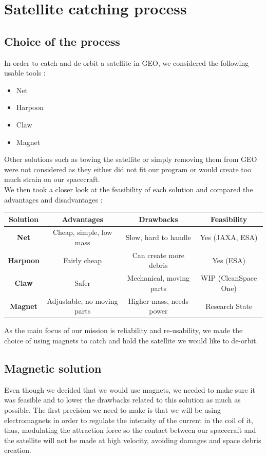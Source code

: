 \chapter{Satellite catching process}
\label{sec:5}
\section{Choice of the process}

\qquad In order to catch and de-orbit a satellite in GEO, we considered the following usable tools :
\begin{itemize}
	\item Net
	\item Harpoon
	\item Claw
	\item Magnet
\end{itemize}

Other solutions such as towing the satellite or simply removing them from GEO were not considered as they either did not fit our program or would create too much strain on our spacecraft.\\

We then took a closer look at the feasibility of each solution and compared the advantages and disadvantages :
\begin{center}
	\begin{tabular}[H]{|c|c|c|c|}
		\hline
		\textbf{Solution} & \textbf{Advantages} & \textbf{Drawbacks} & \textbf{Feasibility}\\
		\hline
		\textbf{Net} & Cheap, simple, low mass &Slow, hard to handle & Yes (JAXA, ESA)\\
		\hline
		\textbf{Harpoon} & Fairly cheap & Can create more debris& Yes (ESA)\\
		\hline
		\textbf{Claw} & Safer & Mechanical, moving parts& WIP (CleanSpace One)\\
		\hline
		\textbf{Magnet} &Adjustable, no moving parts & Higher mass, needs power& Research State\\
		\hline
	\end{tabular}
\end{center}

As the main focus of our mission is reliability and re-usability, we made the choice of using magnets to catch and hold the satellite we would like to de-orbit.

\section{Magnetic solution}
\qquad Even though we decided that we would use magnets, we needed to make sure it was feasible and to lower the drawbacks related to this solution as much as possible. The first precision we need to make is that we will be using electromagnets in order to regulate the intensity of the current in the coil of it, thus, modulating the attraction force so the contact between our spacecraft and the satellite will not be made at high velocity, avoiding damages and space debris creation. \\

